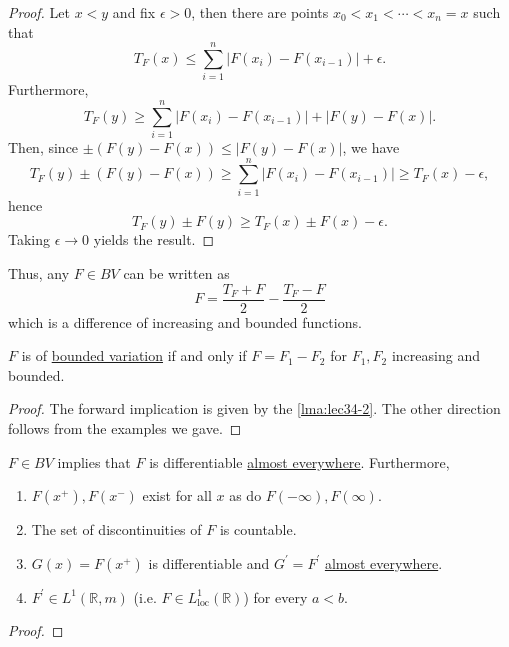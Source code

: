 \begin{proof}
	Let \(x < y\) and fix \(\epsilon > 0\), then there are points \(x_0 < x_1 < \cdots < x_n = x\) such that
	\[
		T_F(x) \leq \sum_{i=1}^n \left\vert F(x_i) - F(x_{i-1}) \right\vert + \epsilon.
	\]
	Furthermore,
	\[
		T_F(y) \geq \sum_{i=1}^n \left\vert F(x_i) - F(x_{i-1}) \right\vert + \left\vert F(y) - F(x) \right\vert .
	\]
	Then, since \(\pm(F(y) - F(x)) \leq \left\vert F(y) - F(x) \right\vert \), we have
	\[
		T_F(y) \pm (F(y) - F(x)) \geq \sum_{i=1}^n \left\vert F(x_i) - F(x_{i-1}) \right\vert \geq T_F(x) - \epsilon,
	\]
	hence
	\[
		T_F(y) \pm F(y) \geq T_F(x) \pm F(x) - \epsilon.
	\]
	Taking \(\epsilon \to 0\) yields the result.
\end{proof}
\begin{remark}
	Thus, any \(F \in BV\) can be written as
	\[
		F = \frac{T_F + F}{2} - \frac{T_F - F}{2}
	\]
	which is a difference of increasing and bounded functions.
\end{remark}

\begin{theorem}
	\(F\) is of \hyperref[def:bounded-variation]{bounded variation} if and only if \(F = F_1 - F_2\) for \(F_1,F_2\) increasing and bounded.
\end{theorem}
\begin{proof}
	The forward implication is given by the \autoref{lma:lec34-2}. The other direction follows from the examples we gave.
\end{proof}

\begin{corollary}\label{col:bounded-variation-differentiation}
	\(F \in BV\) implies that \(F\) is differentiable \hyperref[def:mu-almost-everywhere]{almost everywhere}. Furthermore,
	\begin{enumerate}[(1)]
		\item \(F(x^+),F(x^-)\) exist for all \(x\) as do \(F(-\infty),F(\infty)\).
		\item The set of discontinuities of \(F\) is countable.
		\item \(G(x) = F(x^+)\) is differentiable and \(G^\prime = F^\prime\) \hyperref[def:mu-almost-everywhere]{almost everywhere}.
		\item \(F^\prime \in L^1(\mathbb{R}, m)\) (i.e. \(F \in L^1_{\operatorname{loc}}(\mathbb{R})\)) for every \(a < b\).
	\end{enumerate}
\end{corollary}
\begin{proof}
\end{proof}